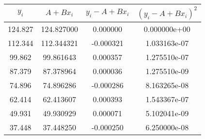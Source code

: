 \begin{tabular}{cccc}
\toprule
  $y_i$ &   $A+Bx_i$ &  $y_i - A+Bx_i$ &  $(y_i - A+Bx_i)^2$ \\
\midrule
124.827 & 124.827000 &        0.000000 &        0.000000e+00 \\
112.344 & 112.344321 &       -0.000321 &        1.033163e-07 \\
 99.862 &  99.861643 &        0.000357 &        1.275510e-07 \\
 87.379 &  87.378964 &        0.000036 &        1.275510e-09 \\
 74.896 &  74.896286 &       -0.000286 &        8.163265e-08 \\
 62.414 &  62.413607 &        0.000393 &        1.543367e-07 \\
 49.931 &  49.930929 &        0.000071 &        5.102041e-09 \\
 37.448 &  37.448250 &       -0.000250 &        6.250000e-08 \\
\bottomrule
\end{tabular}
